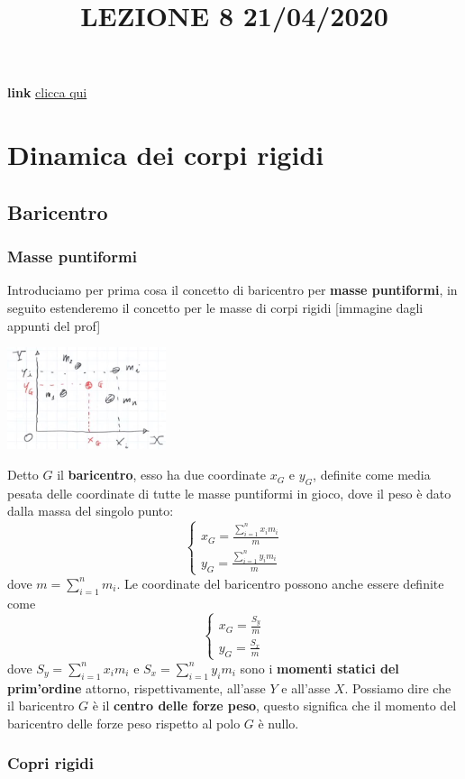 \title{LEZIONE 8 21/04/2020}\newline
\textbf{link} \href{https://web.microsoftstream.com/video/daf8e418-03bf-40c5-8093-3391c41375be}{clicca qui}
\section{Dinamica dei corpi rigidi}
\subsection{Baricentro}
\subsubsection{Masse puntiformi}
Introduciamo per prima cosa il concetto di baricentro per \textbf{masse puntiformi}, in seguito estenderemo il concetto per le masse di corpi rigidi
[immagine dagli appunti del prof]
\begin{center}
    \includegraphics[height=3cm]{../lezione8/img1.JPG}
\end{center}
Detto $G$ il \textbf{baricentro}, esso ha due coordinate $x_G$ e $y_G$, definite come media pesata delle coordinate di tutte le masse puntiformi in gioco, dove il peso è dato dalla massa del singolo punto:
\[
    \begin{cases}
        x_G = \frac{\sum_{i=1}^{n} x_i m_i}{m}\\
        y_G = \frac{\sum_{i=1}^{n} y_i m_i}{m}
    \end{cases}
\]
dove $m = \sum_{i=1}^{n} m_i$.\newline
\newline
Le coordinate del baricentro possono anche essere definite come
\[
    \begin{cases}
        x_G = \frac{S_y}{m}\\
        y_G = \frac{S_x}{m}
    \end{cases}
\]
dove $S_y = \sum_{i=1}^{n} x_i m_i$ e $S_x = \sum_{i=1}^{n} y_i m_i$ sono i \textbf{momenti statici del prim'ordine} attorno, rispettivamente, all'asse $Y$ e all'asse $X$.\newline
\newline
Possiamo dire che  il baricentro $G$ è il \textbf{centro delle forze peso}, questo significa che il momento del baricentro delle forze peso rispetto al polo $G$ è nullo.\subsubsection{Copri rigidi}
